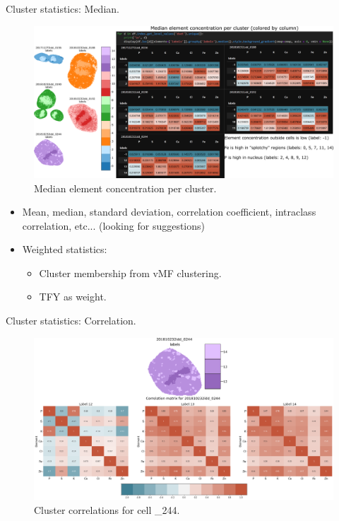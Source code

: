 \documentclass[
]{beamer}
\begin{document}
\begin{frame}{Cluster statistics: Median.}
\begin{figure}[h]
  \includegraphics[width=1\textwidth,height=.5\textheight,keepaspectratio]{Cluster_median.png}
  \caption{Median element concentration per cluster.}
\end{figure}
\begin{itemize}
\item Mean, median, standard deviation, correlation coefficient, intraclass correlation, etc... (looking for suggestions)
\item Weighted statistics:
\begin{itemize}
	\item Cluster membership from vMF clustering.
    \item TFY as weight.
\end{itemize}
\end{itemize}
\end{frame}

\begin{frame}{Cluster statistics: Correlation.}
\begin{figure}
    \centering
    \includegraphics[width=1\textwidth,height=1\textheight,keepaspectratio]{Cluster_corr.png}
    \caption{Cluster correlations for cell \_244.}
    \label{fig:my_label}
\end{figure}
\end{frame}
\end{document}
